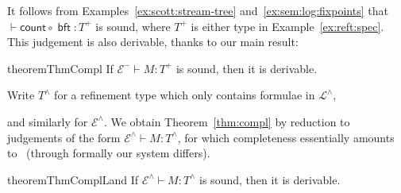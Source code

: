 \documentclass[%
  a4paper,
  UKenglish,
  cleveref,
  autoref,
  thm-restate,
  numberwithinsect,
]{lipics-v2021}
\newcommand\thesis{\vdash}
\newcommand\comp{\mathbin\circ}
\newcommand\Env{\mathcal{E}}    %
\newcommand\term[1]{\mathsf{#1}}
\newcommand\cnt{\term{count}}
\newcommand\bft{\mathop{\term{bft}}}
\newcommand\RT{T}               %
\newcommand\Lang{\mathcal{L}}
\begin{document}
It follows from Examples~\ref{ex:scott:stream-tree} and~\ref{ex:sem:log:fixpoints}
that $\thesis \cnt \comp \bft \colon \RT^+$
is sound, where $\RT^+$ is either type in Example~\ref{ex:reft:spec}.
This judgement is also derivable, thanks to our main result:


\begin{restatable}{theorem}{ThmCompl}
\label{thm:compl}
If $\Env^- \thesis M\colon \RT^+$ is sound,
then it is derivable.
\end{restatable}

Write $\RT^\land$ for a refinement type which only contains formulae in $\Lang^\land$,

and similarly for $\Env^\land$.
We obtain Theorem~\ref{thm:compl} by reduction to 
judgements of the form $\Env^\land \thesis M \colon \RT^\land$,
for which completeness essentially amounts to~\cite{abramsky91apal}
(through formally our system differs).


\begin{restatable}{theorem}{ThmComplLand}
\label{thm:compl:land}
If $\Env^\land \thesis M \colon \RT^\land$ is sound,
then it is derivable.
\end{restatable}


\end{document}
